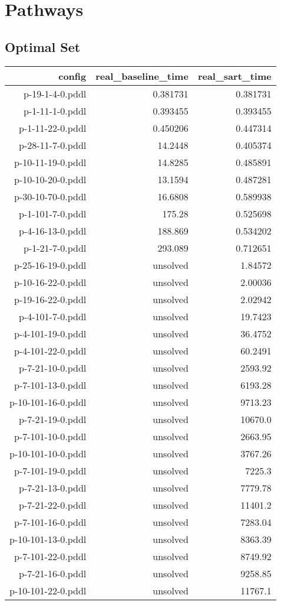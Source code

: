 \documentclass{article}
\begin{document}
                \newpage \section{Pathways}
                    \subsection*{Optimal Set}
                    
                            \begin{center}
                            \scriptsize
                            \begin{tabular}{r|r|r}
                            config & real\_baseline\_time & real\_sart\_time\\\midrule
                             p-19-1-4-0.pddl&0.381731&0.381731\\
 p-1-11-1-0.pddl&0.393455&0.393455\\
 p-1-11-22-0.pddl&0.450206&0.447314\\
 p-28-11-7-0.pddl&14.2448&0.405374\\
 p-10-11-19-0.pddl&14.8285&0.485891\\
 p-10-10-20-0.pddl&13.1594&0.487281\\
 p-30-10-70-0.pddl&16.6808&0.589938\\
 p-1-101-7-0.pddl&175.28&0.525698\\
 p-4-16-13-0.pddl&188.869&0.534202\\
 p-1-21-7-0.pddl&293.089&0.712651\\
 p-25-16-19-0.pddl&unsolved&1.84572\\
 p-10-16-22-0.pddl&unsolved&2.00036\\
 p-19-16-22-0.pddl&unsolved&2.02942\\
 p-4-101-7-0.pddl&unsolved&19.7423\\
 p-4-101-19-0.pddl&unsolved&36.4752\\
 p-4-101-22-0.pddl&unsolved&60.2491\\
 p-7-21-10-0.pddl&unsolved&2593.92\\
 p-7-101-13-0.pddl&unsolved&6193.28\\
 p-10-101-16-0.pddl&unsolved&9713.23\\
 p-7-21-19-0.pddl&unsolved&10670.0\\
 p-7-101-10-0.pddl&unsolved&2663.95\\
 p-10-101-10-0.pddl&unsolved&3767.26\\
 p-7-101-19-0.pddl&unsolved&7225.3\\
 p-7-21-13-0.pddl&unsolved&7779.78\\
 p-7-21-22-0.pddl&unsolved&11401.2\\
 p-7-101-16-0.pddl&unsolved&7283.04\\
 p-10-101-13-0.pddl&unsolved&8363.39\\
 p-7-101-22-0.pddl&unsolved&8749.92\\
 p-7-21-16-0.pddl&unsolved&9258.85\\
 p-10-101-22-0.pddl&unsolved&11767.1
                            \end{tabular}
                            \end{center}
                    
\end{document}
